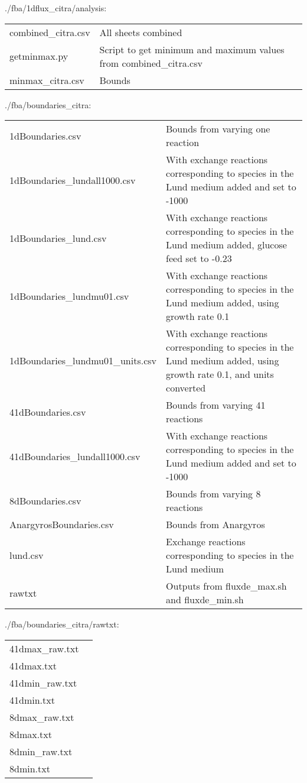 \documentclass[a4paper, parskip=full]{scrreprt}
\begin{document}
./fba/1dflux\_citra/analysis:

\begin{tabularx}{\linewidth}{LL}
combined\_citra.csv & All sheets combined\\
getminmax.py & Script to get minimum and maximum values from combined\_citra.csv\\
minmax\_citra.csv & Bounds
\end{tabularx}

./fba/boundaries\_citra:

\begin{tabularx}{\linewidth}{LL}
1dBoundaries.csv & Bounds from varying one reaction\\
1dBoundaries\_lundall1000.csv & With exchange reactions corresponding to species in the Lund medium added and set to -1000\\
1dBoundaries\_lund.csv & With exchange reactions corresponding to species in the Lund medium added, glucose feed set to -0.23\\
1dBoundaries\_lundmu01.csv & With exchange reactions corresponding to species in the Lund medium added, using growth rate 0.1 \\
1dBoundaries\_lundmu01\_units.csv &  With exchange reactions corresponding to species in the Lund medium added, using growth rate 0.1, and units converted\\
41dBoundaries.csv & Bounds from varying 41 reactions\\
41dBoundaries\_lundall1000.csv & With exchange reactions corresponding to species in the Lund medium added and set to -1000\\
8dBoundaries.csv & Bounds from varying 8 reactions\\
AnargyrosBoundaries.csv & Bounds from Anargyros\\
lund.csv & Exchange reactions corresponding to species in the Lund medium\\
rawtxt & Outputs from fluxde\_max.sh and fluxde\_min.sh
\end{tabularx}

./fba/boundaries\_citra/rawtxt:

\begin{tabularx}{\linewidth}{LL}
41dmax\_raw.txt\\
41dmax.txt\\
41dmin\_raw.txt\\
41dmin.txt\\
8dmax\_raw.txt\\
8dmax.txt\\
8dmin\_raw.txt\\
8dmin.txt
\end{tabularx}
\end{document}
